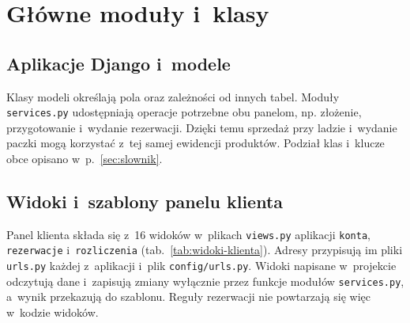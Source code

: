 \documentclass[12pt,a4paper,oneside]{article}
\begin{document}
\clearpage
\section{Główne moduły i~klasy}
\label{ch:moduly}

\subsection{Aplikacje Django i~modele}

Klasy modeli określają pola oraz zależności od innych tabel. Moduły \texttt{services.py} udostępniają operacje potrzebne obu panelom, np. złożenie, przygotowanie i~wydanie rezerwacji. Dzięki temu sprzedaż przy ladzie i~wydanie paczki mogą korzystać z~tej samej ewidencji produktów. Podział klas i~klucze obce opisano w~p.~\ref{sec:slownik}.


\subsection{Widoki i~szablony panelu klienta}
\label{sec:widoki-klienta}

Panel klienta składa się z~16 widoków w~plikach \texttt{views.py} aplikacji \texttt{konta}, \texttt{rezerwacje} i~\texttt{rozliczenia} (tab.~\ref{tab:widoki-klienta}). Adresy przypisują im pliki \texttt{urls.py} każdej z~aplikacji i~plik \texttt{config/urls.py}. Widoki napisane w~projekcie odczytują dane i~zapisują zmiany wyłącznie przez funkcje modułów \texttt{services.py}, a~wynik przekazują do szablonu. Reguły rezerwacji nie powtarzają się więc w~kodzie widoków.
\end{document}

